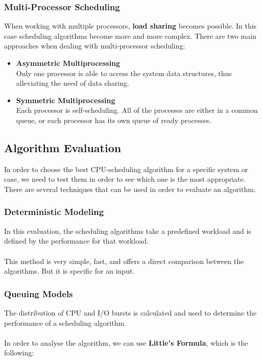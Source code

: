 \documentclass{article}
\begin{document}
\subsubsection{Multi-Processor Scheduling}
When working with multiple processors, \textbf{load sharing} becomes possible. In this case scheduling algorithms become more and more complex. There are two main approaches when dealing with multi-processor scheduling:

\begin{itemize}
	\item \textbf{Asymmetric Multiprocessing}
	\vspace{.2cm} \\
	Only one processor is able to access the system data structures, thus alleviating the need of data sharing.
	
	\item \textbf{Symmetric Multiprocessing}
	\vspace{.2cm} \\
	Each processor is self-scheduling. All of the processes are either in a common queue, or each processor has its own queue of ready processes.
\end{itemize}

\subsection{Algorithm Evaluation}
In order to choose the best CPU-scheduling algorithm for a specific system or case, we need to test them in order to see which one is the most appropriate. There are several techniques that can be used in order to evaluate an algorithm.

\subsubsection{Deterministic Modeling}
In this evaluation, the scheduling algorithms take a predefined workload and is defined by the performance for that workload. \\ \\
This method is very simple, fast, and offers a direct comparison between the algorithms. But it is specific for an input.

\subsubsection{Queuing Models}
The distribution of CPU and I/O bursts is calculated and used to determine the performance of a scheduling algorithm. \\ \\
In order to analyse the algorithm, we can use \textbf{Little's Formula}, which is the following:
\end{document}
